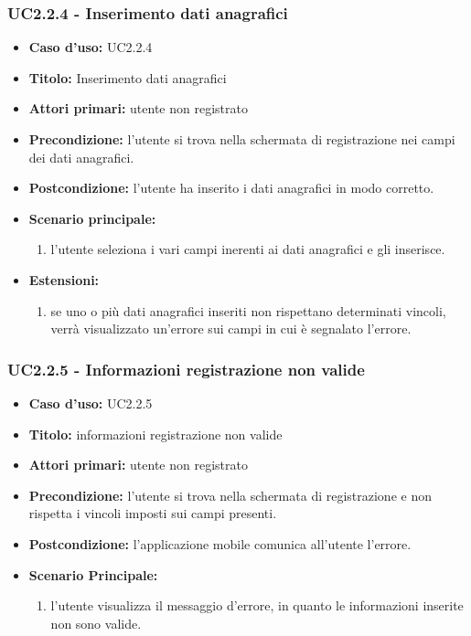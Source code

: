 \documentclass[casi-duso]{subfiles}
\begin{document}
\subsubsection{UC2.2.4 - Inserimento dati anagrafici}
\label{subsub:uc2.2.4utente}
\begin{itemize}
  \item \textbf{Caso d’uso:} UC2.2.4 
  \item \textbf{Titolo:} Inserimento dati anagrafici
  \item \textbf{Attori primari:} utente non registrato
  \item \textbf{Precondizione:} l'utente si trova nella schermata di registrazione nei campi dei dati anagrafici.
  \item \textbf{Postcondizione:} l'utente ha inserito i dati anagrafici in modo corretto. 
  \item \textbf{Scenario principale:} 
  \begin{enumerate}
    \item l'utente seleziona i vari campi inerenti ai dati anagrafici e gli inserisce.
  \end{enumerate}
  \item \textbf{Estensioni:} 
  \begin{enumerate}
    \item se uno o più dati anagrafici inseriti non rispettano determinati vincoli, verrà visualizzato un'errore sui campi in cui è segnalato l'errore.
  \end{enumerate}     
\end{itemize}

\subsubsection{UC2.2.5 - Informazioni registrazione non valide}
\label{subsub:uc2.2.5utente}
\begin{itemize}
  \item \textbf{Caso d’uso:} UC2.2.5 
  \item \textbf{Titolo:} informazioni registrazione non valide
  \item \textbf{Attori primari:} utente non registrato
  \item \textbf{Precondizione:} l'utente si trova nella schermata di registrazione e non rispetta i vincoli imposti sui campi presenti.
  \item \textbf{Postcondizione:} l'applicazione mobile comunica all'utente l'errore.
  \item \textbf{Scenario Principale:} 
  \begin{enumerate}
    \item l'utente visualizza il messaggio d'errore, in quanto le informazioni inserite non sono valide.
  \end{enumerate}   
\end{itemize}
\end{document}
